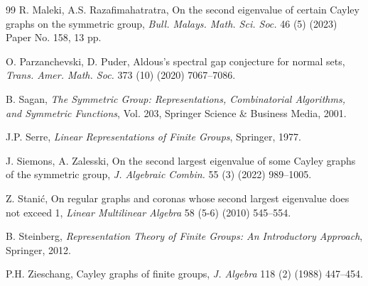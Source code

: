 \documentclass[12pt, a4paper]{article}
\theoremstyle{definition}
\begin{document}
\begin{thebibliography}{99}
R. Maleki, A.S. Razafimahatratra, On the second eigenvalue of certain Cayley graphs on the symmetric group, {\em Bull. Malays. Math. Sci. Soc.} 46 (5) (2023) Paper No. 158, 13 pp.



O. Parzanchevski, D. Puder, Aldous's spectral gap conjecture for normal sets, {\em Trans. Amer. Math. Soc.} 373 (10) (2020) 7067--7086.



B. Sagan, {\em The Symmetric Group: Representations, Combinatorial Algorithms, and Symmetric Functions}, Vol. 203, Springer Science \& Business Media, 2001.

J.P. Serre, {\em Linear Representations of Finite Groups}, Springer, 1977.

J. Siemons, A. Zalesski, On the second largest eigenvalue of some Cayley graphs of the symmetric group, {\em J. Algebraic Combin.} 55 (3) (2022) 989--1005.

Z. Stani\'{c}, On regular graphs and coronas whose second largest eigenvalue does not exceed 1, {\em Linear Multilinear Algebra} 58 (5-6) (2010) 545--554.

B. Steinberg, {\em Representation Theory of Finite Groups: An Introductory Approach}, Springer, 2012.

P.H. Zieschang, Cayley graphs of finite groups, {\em J. Algebra} 118 (2) (1988) 447--454.





\end{thebibliography}
\end{document}
